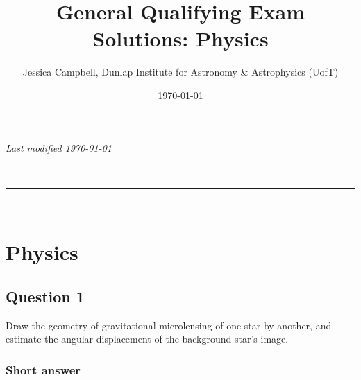 \documentclass[a4paper,10pt]{article}
\makeatletter
\newcommand{\linia}{\rule{\linewidth}{0.5pt}}
\renewcommand{\maketitle}{
\begin{center}
\vspace{2ex}
{\huge \textsc{\@title}}
\vspace{1ex}
\\
\linia\\
\@author
\vspace{4ex}
\end{center}
}
\makeatother
\begin{document}
\hfill{\textit{Last modified \today}}
\title{General Qualifying Exam Solutions: Physics}
\author{Jessica Campbell, Dunlap Institute for Astronomy \& Astrophysics (UofT)}
\date{\today}
\maketitle

\tableofcontents



%
%
%
%

\newpage
\section{Physics}


\subsection{Question 1}

Draw the geometry of gravitational microlensing of one star by another, and estimate the angular displacement of the background star's image.

\subsubsection{Short answer}
\end{document}
